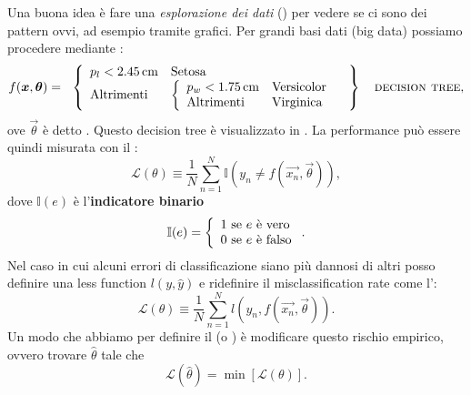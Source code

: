 \documentclass[10pt]{article}
\begin{document}
\begin{example}
Una buona idea è fare una \textit{esplorazione dei dati} () per vedere se ci sono dei pattern ovvi, ad esempio tramite grafici. Per grandi basi dati (big data) possiamo procedere mediante :
\begin{equation}
f(\boldsymbol{x}, \boldsymbol{\theta}) = \left.\begin{array}{l}
\left\{\begin{array}{ll}
p_l < \qty{2.45}{cm} & \text{Setosa} \\
\text{Altrimenti} & \left\{\begin{array}{ll}
p_w < \qty{1.75}{cm} & \text{Versicolor} \\
\text{Altrimenti} & \text{Virginica} \\
\end{array}\right.
\end{array}\right.
\end{array}\right\} \quad\text{\textsc{decision tree}},
\end{equation}
ove $\vec{\theta}$ è detto . Questo decision tree è visualizzato in . La performance può essere quindi misurata con il :
\begin{equation}
\mathcal{L}(\theta) \equiv \frac{1}{N}\sum_{n=1}^N \mathbb{I}\left( y_n \neq f(\vec{x_n}, \vec{\theta}) \right),
\end{equation}
dove $\mathbb{I}(e)$ è l'\textbf{indicatore binario}
\begin{equation}
\mathbb{I}(e) = \left\{\begin{array}{l@{\text{ se } e \text{ è }}l}
1 & \text{vero} \\
0 & \text{falso} \\
\end{array}\right..
\end{equation}
Nel caso in cui alcuni errori di classificazione siano più dannosi di altri posso definire una less function $l(y, \hat{y})$ e ridefinire il misclassification rate come l':
\begin{equation}
\mathcal{L}(\theta) \equiv \frac{1}{N}\sum_{n=1}^N l\left( y_n, f(\vec{x_n}, \vec{\theta}) \right).
\end{equation}
Un modo che abbiamo per definire il  (o ) è modificare questo rischio empirico, ovvero trovare $\hat{\theta}$ tale che
\begin{equation}
\mathcal{L}(\hat{\theta}) = \min[\mathcal{L}(\theta)].
\end{equation}


\end{example}
\end{document}
